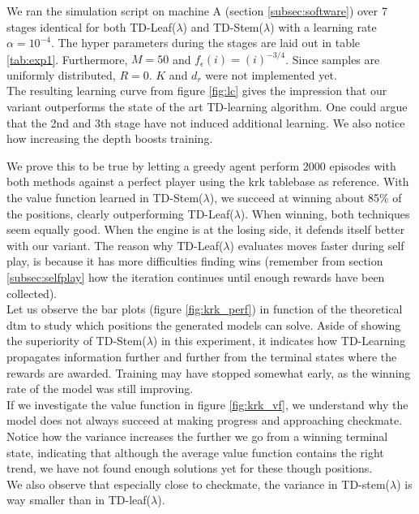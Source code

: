 We ran the simulation script on machine A (section \ref{subsec:software}) over 7 stages identical for both TD-Leaf($\lambda$) and TD-Stem($\lambda$) with a learning rate $\alpha=10^{-4}$. The hyper parameters during the stages are laid out in table \ref{tab:exp1}. Furthermore, $M=50$ and $f_\epsilon(i)=(i)^{-3/4}$. Since samples are uniformly distributed, $R=0$. $K$ and $d_r$ were not implemented yet.\\

The resulting learning curve from figure \ref{fig:lc} gives the impression that our variant outperforms the state of the art TD-learning algorithm. One could argue that the 2nd and 3th stage have not induced additional learning. We also notice how increasing the depth boosts training. 

We prove this to be true by letting a greedy agent perform 2000 episodes with both methods against a perfect player using the \gls{krk} tablebase as reference. With the value function learned in TD-Stem($\lambda$), we succeed at winning about 85\% of the positions, clearly outperforming TD-Leaf($\lambda$). When winning, both techniques seem equally good. When the engine is at the losing side, it defends itself better with our variant. The reason why TD-Leaf($\lambda$) evaluates moves faster during self play, is because it has more difficulties finding wins (remember from section \ref{subsec:selfplay} how the iteration continues until enough rewards have been collected).\\

Let us observe the bar plots (figure \ref{fig:krk_perf}) in function of the theoretical \gls{dtm} to study which positions the generated models can solve. Aside of showing the superiority of TD-Stem($\lambda$) in this experiment, it indicates how TD-Learning propagates information further and further from the terminal states where the rewards are awarded. Training may have stopped somewhat early, as the winning rate of the model was still improving.\\

If we investigate the value function in figure \ref{fig:krk_vf}, we understand why the model does not always succeed at making progress and approaching checkmate. Notice how the variance increases the further we go from a winning terminal state, indicating that although the average value function contains the right trend, we have not found enough solutions yet for these though positions. \\
We also observe that especially close to checkmate, the variance in TD-stem($\lambda$) is way smaller than in TD-leaf($\lambda$).

